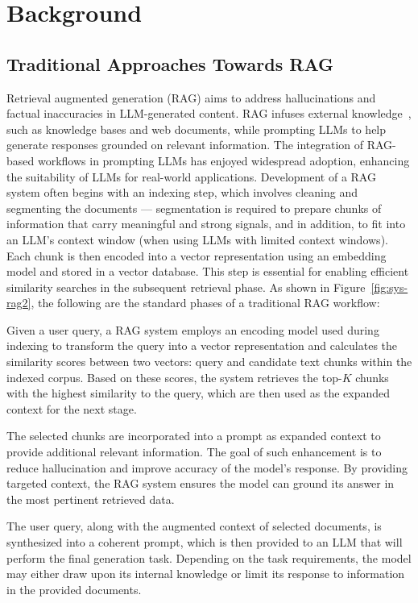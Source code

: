 \section{Background}
\label{sec:background}

\subsection{Traditional Approaches Towards RAG}
Retrieval augmented generation (RAG) aims to address hallucinations and factual inaccuracies in LLM-generated content. RAG infuses 
external knowledge~\cite{peng2023check, lazaridou2022internet}, such as knowledge bases and web documents, while prompting LLMs to help generate responses grounded on relevant information. The integration of RAG-based workflows in prompting LLMs has enjoyed widespread adoption, enhancing the suitability of LLMs for real-world applications. Development of a RAG system often begins with an indexing step, which involves cleaning and segmenting the documents --- segmentation is required to prepare chunks of information that carry meaningful and strong signals, and in addition, to fit into an LLM's context window (when using LLMs with limited context windows). Each chunk is then encoded into a vector representation using an embedding model and stored in a vector database. This step is essential for enabling efficient similarity searches in the subsequent retrieval phase. As shown in Figure~\ref{fig:sys-rag2}, the following are the standard phases of a traditional RAG workflow:

 Given a user query, a RAG system employs an encoding model used during indexing to transform the query into a vector representation and calculates the similarity scores between two vectors: query and candidate text chunks within the indexed corpus. Based on these scores, the system retrieves the top-$K$ chunks with the highest similarity to the query, which are then used as the expanded context for the next stage.

 The selected chunks are incorporated into a prompt as expanded context to provide additional relevant information. The goal of such enhancement is to reduce hallucination and improve accuracy of the model’s response. By providing targeted context, the RAG system ensures the model can ground its answer in the most pertinent retrieved data.

 The user query, along with the augmented context of selected documents, is synthesized into a coherent prompt, which is then provided to an LLM that will perform the final generation task. Depending on the task requirements, the model may either draw upon its internal knowledge or limit its response to information in the provided documents. 

